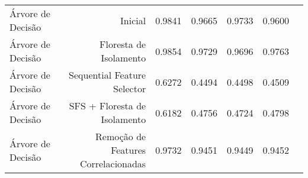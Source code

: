 \begin{tabular}{|l|r|r|r|r|r|r|}
             Árvore de Decisão &                              Inicial &    0.9841 &  0.9665 &     0.9733 &  0.9600 \\
             Árvore de Decisão &               Floresta de Isolamento &    0.9854 &  0.9729 &     0.9696 &  0.9763 \\
             Árvore de Decisão &          Sequential Feature Selector &    0.6272 &  0.4494 &     0.4498 &  0.4509 \\
             Árvore de Decisão &         SFS + Floresta de Isolamento &    0.6182 &  0.4756 &     0.4724 &  0.4798 \\
             Árvore de Decisão &  Remoção de Features Correlacionadas &    0.9732 &  0.9451 &     0.9449 &  0.9452 \\
\hline
\end{tabular}
